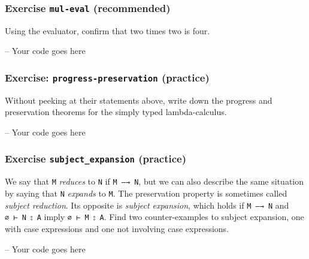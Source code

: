 \hypertarget{exercise-mul-eval-recommended}{%
\subsubsection{\texorpdfstring{Exercise \texttt{mul-eval}
(recommended)}{Exercise mul-eval (recommended)}}\label{exercise-mul-eval-recommended}}

Using the evaluator, confirm that two times two is four.

\begin{fence}
\begin{code}
-- Your code goes here
\end{code}
\end{fence}

\hypertarget{exercise-progress-preservation-practice}{%
\subsubsection{\texorpdfstring{Exercise: \texttt{progress-preservation}
(practice)}{Exercise: progress-preservation (practice)}}\label{exercise-progress-preservation-practice}}

Without peeking at their statements above, write down the progress and
preservation theorems for the simply typed lambda-calculus.

\begin{fence}
\begin{code}
-- Your code goes here
\end{code}
\end{fence}

\hypertarget{exercise-subject_expansion-practice}{%
\subsubsection{\texorpdfstring{Exercise \texttt{subject\_expansion}
(practice)}{Exercise subject\_expansion (practice)}}\label{exercise-subject_expansion-practice}}

We say that \texttt{M} \emph{reduces} to \texttt{N} if
\texttt{M\ —→\ N}, but we can also describe the same situation by saying
that \texttt{N} \emph{expands} to \texttt{M}. The preservation property
is sometimes called \emph{subject reduction}. Its opposite is
\emph{subject expansion}, which holds if \texttt{M\ —→\ N} and
\texttt{∅\ ⊢\ N\ ⦂\ A} imply \texttt{∅\ ⊢\ M\ ⦂\ A}. Find two
counter-examples to subject expansion, one with case expressions and one
not involving case expressions.

\begin{fence}
\begin{code}
-- Your code goes here
\end{code}
\end{fence}

